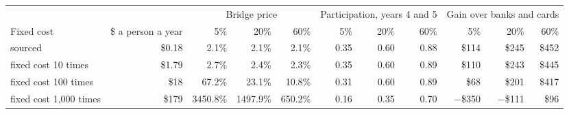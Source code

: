 \begin{tabular}{lrrrrrrrrrr}
\toprule
 & & \multicolumn{3}{c}{Bridge price} & \multicolumn{3}{c}{Participation, years 4 and 5} & \multicolumn{3}{c}{Gain over banks and cards} \\
Fixed cost & \$ a person a year & 5\% & 20\% & 60\% & 5\% & 20\% & 60\% & 5\% & 20\% & 60\% \\
\midrule
sourced & \$0.18 & 2.1\% & 2.1\% & 2.1\% & 0.35 & 0.60 & 0.88 & \$114 & \$245 & \$452 \\
\midrule
fixed cost 10 times & \$1.79 & 2.7\% & 2.4\% & 2.3\% & 0.35 & 0.60 & 0.89 & \$110 & \$243 & \$445 \\
fixed cost 100 times & \$18 & 67.2\% & 23.1\% & 10.8\% & 0.31 & 0.60 & 0.89 & \$68 & \$201 & \$417 \\
fixed cost 1,000 times & \$179 & 3450.8\% & 1497.9\% & 650.2\% & 0.16 & 0.35 & 0.70 & $-$\$350 & $-$\$111 & \$96 \\
\bottomrule
\end{tabular}
